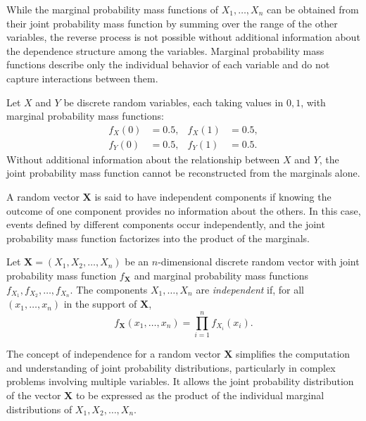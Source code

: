 While the marginal probability mass functions of $X_{1}, \ldots, X_{n}$ can be obtained from their joint probability mass function by summing over the range of the other variables, the reverse process is not possible without additional information about the dependence structure among the variables. Marginal probability mass functions describe only the individual behavior of each variable and do not capture interactions between them.

\begin{example}
Let $X$ and $Y$ be discrete random variables, each taking values in ${0, 1}$, with marginal probability mass functions:
\[
\begin{aligned}
f_{X}(0) &= 0.5, & f_{X}(1) &= 0.5, \\
f_{Y}(0) &= 0.5, & f_{Y}(1) &= 0.5.
\end{aligned}
\]
Without additional information about the relationship between $X$ and $Y$, the joint probability mass function cannot be reconstructed from the marginals alone.
\end{example}

A random vector $\mathbf{X}$ is said to have independent components if knowing the outcome of one component provides no information about the others. In this case, events defined by different components occur independently, and the joint probability mass function factorizes into the product of the marginals.

\begin{definition}\label{def:independent_random_variables}
Let $\mathbf{X} = (X_{1}, X_{2}, \ldots, X_{n})$ be an $n$-dimensional discrete random vector with joint probability mass function $f_{\mathbf{X}}$ and marginal probability mass functions $f_{X_{1}}, f_{X_{2}}, \ldots, f_{X_{n}}$.
The components $X_{1}, \ldots, X_{n}$ are \emph{independent} if, for all $(x_{1}, \ldots, x_{n})$ in the support of $\mathbf{X}$,
\[
f_{\mathbf{X}}(x_{1}, \ldots, x_{n}) = \prod_{i=1}^{n} f_{X_{i}}(x_{i}).
\]
\end{definition}

The concept of independence for a random vector $\mathbf{X}$ simplifies the computation and understanding of joint probability distributions, particularly in complex problems involving multiple variables. It allows the joint probability distribution of the vector $\mathbf{X}$ to be expressed as the product of the individual marginal distributions of $X_{1}, X_{2}, \ldots, X_{n}$.

